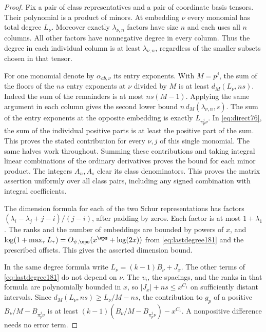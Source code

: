 \documentclass[a4paper,11pt]{article}
\theoremstyle{definition}
\theoremstyle{remark}
\numberwithin{equation}{section}
\begin{document}
\begin{proof}
Fix a pair of class representatives and a pair of coordinate
basis tensors. Their polynomial is a product of minors. At
embedding \(\nu\) every monomial has total degree \(L_\nu\).
Moreover exactly \(\lambda_{\nu,n}\) factors have size \(n\)
and each uses all \(n\) columns. All other factors have
nonnegative degree in every column. Thus the degree in each
individual column is at least \(\lambda_{\nu,n}\), regardless
of the smaller subsets chosen in that tensor.

For one monomial denote by \(\alpha_{ab,\nu}\) its entry
exponents. With \(M=p^j\), the sum of the floors of the \(ns\) entry exponents
at \(\nu\) divided by \(M\) is at least \(d_M(L_\nu,ns)\).
Indeed the sum of the remainders is at most \(ns(M-1)\).
Applying the same argument in each column gives the second
lower bound \(n\,d_M(\lambda_{\nu,n},s)\). The sum of the
entry exponents at the opposite embedding is exactly
\(L_{\pi_p^j\nu}\). In \eqref{eq:direct76}, the sum of the
individual positive parts is at least the positive part of the
sum. This proves the stated contribution for every \(\nu,j\)
of this single monomial. The same halves work throughout.
Summing these contributions and taking integral linear combinations
of the ordinary derivatives proves the bound for each minor
product. The integers \(A_n,A_s\) clear its class denominators.
This proves the matrix assertion uniformly over all class pairs,
including any signed combination with integral coefficients.

The dimension formula for each of the two Schur representations
has factors \((\lambda_i-\lambda_j+j-i)/(j-i)\), after padding
by zeros. Each factor is at most \(1+\lambda_1\).
The ranks and the number of embeddings are bounded by powers
of \(x\), and \(\log(1+\max_\tau L_\tau)=O_{\psi,\eps}
(x^\eps+\log(2x))\) from \eqref{eq:lastdegree181} and the
prescribed offsets. This gives the asserted dimension bound.

In the same degree formula write \(L_\nu=(k-1)B_\nu+J_x\).
The other terms of \eqref{eq:lastdegree181} do not depend
on \(\nu\). The \(v_i\), the spacings, and the ranks in
that formula are polynomially bounded in \(x\), so
\(|J_x|+ns\le x^{C_1}\) on sufficiently distant intervals.
Since \(d_M(L_\nu,ns)\ge L_\nu/M-ns\), the contribution to
\(g_p\) of a positive \(B_\nu/M-B_{\pi_p^j\nu}\) is at least
\((k-1)(B_\nu/M-B_{\pi_p^j\nu})-x^{C_1}\). A nonpositive
difference needs no error term.


\end{proof}
\end{document}
